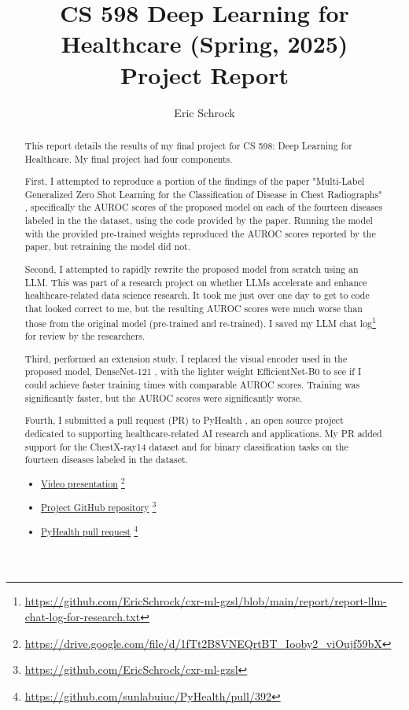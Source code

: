 \documentclass[letterpaper]{article} %
\title{CS 598 Deep Learning for Healthcare (Spring, 2025)\\Project Report}
\author {Eric Schrock}
\begin{document}
\maketitle

\begin{abstract}
This report details the results of my final project for CS 598: Deep Learning for Healthcare. My final project had four components.

First, I attempted to reproduce a portion of the findings of the paper "Multi-Label Generalized Zero Shot Learning for the Classification of Disease in Chest Radiographs" \cite{hayat2021multilabel}, specifically the AUROC scores of the proposed model on each of the fourteen diseases labeled in the the dataset, using the code provided by the paper. Running the model with the provided pre-trained weights reproduced the AUROC scores reported by the paper, but retraining the model did not.

Second, I attempted to rapidly rewrite the proposed model from scratch using an LLM. This was part of a research project on whether LLMs accelerate and enhance healthcare-related data science research. It took me just over one day to get to code that looked correct to me, but the resulting AUROC scores were much worse than those from the original model (pre-trained and re-trained). I saved my LLM chat log\footnote{\url{https://github.com/EricSchrock/cxr-ml-gzsl/blob/main/report/report-llm-chat-log-for-research.txt}} for review by the researchers.

Third, performed an extension study. I replaced the visual encoder used in the proposed model, DenseNet-121 \cite{huang2018denselyconnectedconvolutionalnetworks}, with the lighter weight EfficientNet-B0 \cite{tan2020efficientnetrethinkingmodelscaling} to see if I could achieve faster training times with comparable AUROC scores. Training was significantly faster, but the AUROC scores were significantly worse.

Fourth, I submitted a pull request (PR) to PyHealth \cite{pyhealth2023yang}, an open source project dedicated to supporting healthcare-related AI research and applications. My PR added support for the ChestX-ray14 dataset \cite{Wang_2017} and for binary classification tasks on the fourteen diseases labeled in the dataset.

\begin{itemize}
    \item \href{https://drive.google.com/file/d/1fTt2B8VNEQrtBT_Iooby2_viOujf59bX}{Video presentation} \footnote{\url{https://drive.google.com/file/d/1fTt2B8VNEQrtBT_Iooby2_viOujf59bX}}
    \item \href{https://github.com/EricSchrock/cxr-ml-gzsl}{Project GitHub repository} \footnote{\url{https://github.com/EricSchrock/cxr-ml-gzsl}}
    \item \href{https://github.com/sunlabuiuc/PyHealth/pull/392}{PyHealth pull request} \footnote{\url{https://github.com/sunlabuiuc/PyHealth/pull/392}}
\end{itemize}
\end{abstract}
\end{document}
